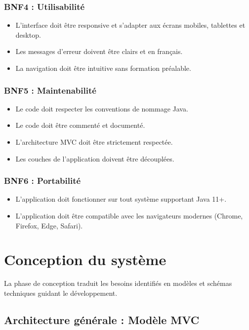 \documentclass[12pt,a4paper]{report}
\begin{document}
\subsubsection{BNF4 : Utilisabilité}

\begin{itemize}
    \item L'interface doit être responsive et s'adapter aux écrans mobiles, tablettes et desktop.
    \item Les messages d'erreur doivent être clairs et en français.
    \item La navigation doit être intuitive sans formation préalable.
\end{itemize}

\subsubsection{BNF5 : Maintenabilité}

\begin{itemize}
    \item Le code doit respecter les conventions de nommage Java.
    \item Le code doit être commenté et documenté.
    \item L'architecture MVC doit être strictement respectée.
    \item Les couches de l'application doivent être découplées.
\end{itemize}

\subsubsection{BNF6 : Portabilité}

\begin{itemize}
    \item L'application doit fonctionner sur tout système supportant Java 11+.
    \item L'application doit être compatible avec les navigateurs modernes (Chrome, Firefox, Edge, Safari).
\end{itemize}

\section{Conception du système}

La phase de conception traduit les besoins identifiés en modèles et schémas techniques guidant le développement.

\subsection{Architecture générale : Modèle MVC}
\end{document}
